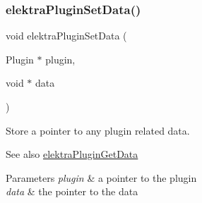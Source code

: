 \subsubsection{\texorpdfstring{elektra\+Plugin\+Set\+Data()}{elektraPluginSetData()}}
{\footnotesize\ttfamily void elektra\+Plugin\+Set\+Data (\begin{DoxyParamCaption}\item[{Plugin $\ast$}]{plugin,  }\item[{void $\ast$}]{data }\end{DoxyParamCaption})}



Store a pointer to any plugin related data. 

\begin{DoxySeeAlso}{See also}
\hyperlink{group__plugin_gaafcf3216b46292f222b8cc7828b4dd20}{elektra\+Plugin\+Get\+Data} 
\end{DoxySeeAlso}

\begin{DoxyParams}{Parameters}
{\em plugin} & a pointer to the plugin \\
\hline
{\em data} & the pointer to the data \\
\hline
\end{DoxyParams}
